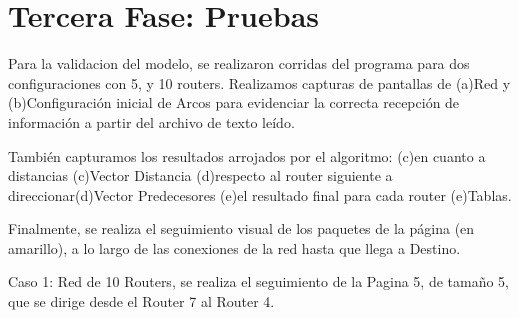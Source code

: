 \documentclass[12pt]{article} %
\begin{document}
\section{Tercera Fase: Pruebas}
Para la validacion del modelo, se realizaron corridas del programa para dos configuraciones con 5,  y 10 routers.
Realizamos capturas de pantallas de (a)Red y (b)Configuración inicial de Arcos para evidenciar la correcta recepción de información a partir del archivo de texto leído.

También capturamos los resultados arrojados por el algoritmo:
(c)en cuanto a distancias \rightarrow (c)Vector Distancia
(d)respecto al router siguiente a direccionar\rightarrow (d)Vector Predecesores
(e)el resultado final para cada router \rightarrow (e)Tablas.

Finalmente, se realiza el seguimiento visual de los paquetes de la página (en amarillo), a lo largo de las conexiones de la red hasta que llega a Destino.

Caso 1: Red de 10 Routers, se realiza el seguimiento de la Pagina 5, de tamaño 5, que se dirige desde el Router 7 al Router 4.

\begin{figure}[H] %
\label{fig:config_1_A}
\end{figure}
\end{document}
